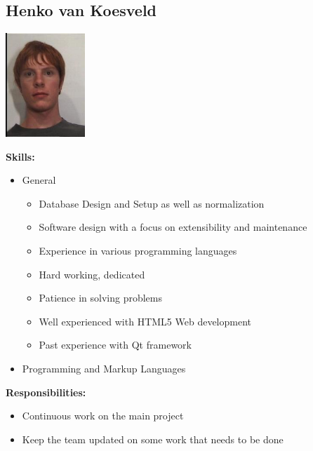 \documentclass[a4paper,12pt,final]{article}
\begin{document}
\subsection{Henko van Koesveld}
\begin{center}
\includegraphics[width=3cm]{Henko.jpeg}
\end{center}
\textbf{Skills:}
\begin{itemize}
\item General
\begin{itemize}
	\item Database Design and Setup as well as normalization
	\item Software design with a focus on extensibility and maintenance
	\item Experience in various programming languages
	\item Hard working, dedicated
	\item Patience in solving problems
	\item Well experienced with HTML5 Web development
	\item Past experience with Qt framework
\end{itemize}
\item Programming and Markup Languages
\begin{itemize}
\end{itemize}
\end{itemize}
\textbf{Responsibilities:}
\begin{itemize}
\item Continuous work on the main project
\item Keep the team updated on some work that needs to be done
\end{itemize}
\end{document}
